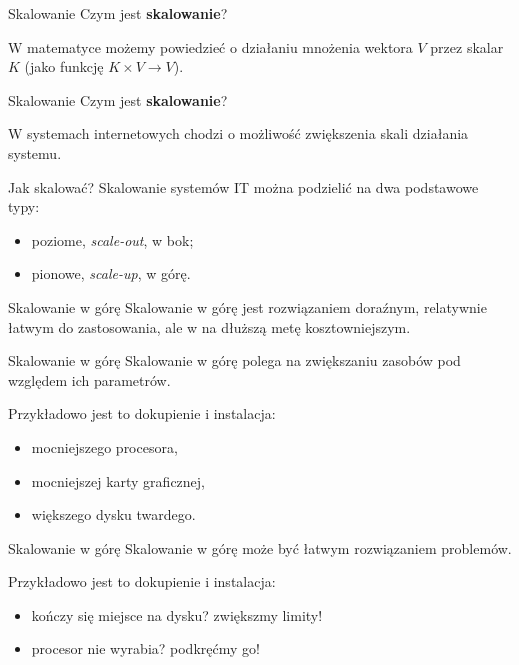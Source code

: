 \begin{frame}{Skalowanie}	
	Czym jest \textbf{skalowanie}?
	
	W matematyce możemy powiedzieć o działaniu mnożenia wektora $V$ przez skalar $K$ (jako funkcję $K \times V \rightarrow V$).
\end{frame}

\begin{frame}{Skalowanie}	
	Czym jest \textbf{skalowanie}?
	
	W systemach internetowych chodzi o możliwość zwiększenia skali działania systemu.
\end{frame}

\begin{frame}{Jak skalować?}	
	Skalowanie systemów IT można podzielić na dwa podstawowe typy:
	\begin{itemize}
	\item poziome, \emph{scale-out}, w bok;
	\item pionowe, \emph{scale-up}, w górę.
	\end{itemize}
\end{frame}

\begin{frame}{Skalowanie w górę}	
	Skalowanie w górę jest rozwiązaniem doraźnym, relatywnie łatwym do zastosowania, ale w na dłuższą metę kosztowniejszym.
\end{frame}

\begin{frame}{Skalowanie w górę}	
	Skalowanie w górę polega na zwiększaniu zasobów pod względem ich parametrów. 
	
	Przykładowo jest to dokupienie i instalacja:
	\begin{itemize}
	\item mocniejszego procesora,
	\item mocniejszej karty graficznej,
	\item większego dysku twardego.
	\end{itemize}
\end{frame}

\begin{frame}{Skalowanie w górę}	
	Skalowanie w górę może być łatwym rozwiązaniem problemów.
	
	Przykładowo jest to dokupienie i instalacja:
	\begin{itemize}
	\item kończy się miejsce na dysku? zwiększmy limity!
	\item procesor nie wyrabia? podkręćmy go!
	\end{itemize}
\end{frame}

